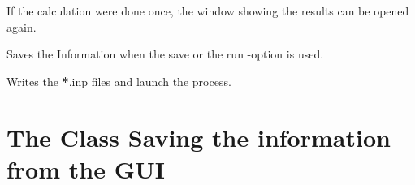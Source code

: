 \documentclass[letterpaper,10pt,english]{sphinxmanual}
\begin{document}
\begin{fulllineitems}
\begin{fulllineitems}
\label{GUI:PKPgui.Ui_PKP.ReOpenResultWindow}
If the calculation were done once, the window showing the results can be opened again.

\end{fulllineitems}


\begin{fulllineitems}
\label{GUI:PKPgui.Ui_PKP.SaveInfos}
Saves the Information when the save or the run -option is used.

\end{fulllineitems}


\begin{fulllineitems}
\label{GUI:PKPgui.Ui_PKP.WriteRun}
Writes the {\color{red}\bfseries{}*}.inp files and launch the process.

\end{fulllineitems}


\end{fulllineitems}



\section{The Class Saving the information from the GUI}
\label{GUI:the-class-saving-the-information-from-the-gui}
\end{document}
